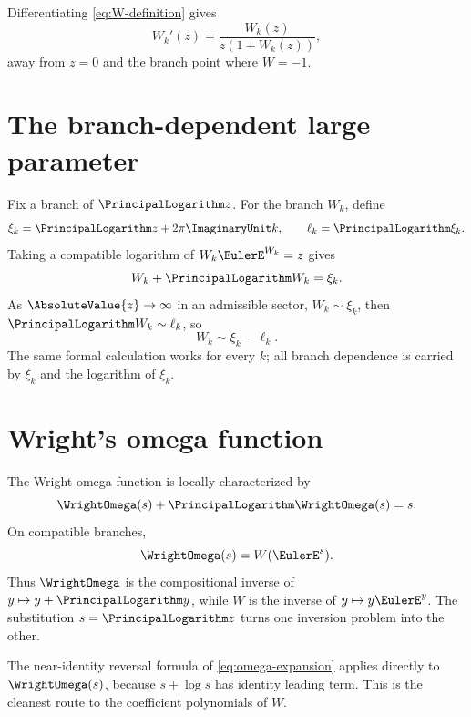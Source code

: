 \documentclass[11pt,openany]{book}
\theoremstyle{definition}
\theoremstyle{plain}
\theoremstyle{remark}
\begin{document}
Differentiating \cref{eq:W-definition} gives
\begin{equation}\label{eq:W-derivative-exact}
 W_k'(z)=\frac{W_k(z)}{z(1+W_k(z))},
\end{equation}
away from \(z=0\) and the branch point where \(W=-1\).

\section{The branch-dependent large parameter}
Fix a branch of \(\PrincipalLogarithm z\). For the branch \(W_k\), define
\begin{equation}\label{eq:xi-k}
 \xi_k=\PrincipalLogarithm z+2\pi\ImaginaryUnit k,
 \qquad
 \ell_k=\PrincipalLogarithm\xi_k.
\end{equation}
Taking a compatible logarithm of \(W_k\EulerE^{W_k}=z\) gives
\begin{equation}\label{eq:W-log-branch}
 W_k+\PrincipalLogarithm W_k=\xi_k.
\end{equation}
As \(\AbsoluteValue{z}\to\infty\) in an admissible sector, \(W_k\sim\xi_k\), then \(\PrincipalLogarithm W_k\sim\ell_k\), so
\begin{equation}\label{eq:W-leading-two}
 W_k\sim\xi_k-\ell_k.
\end{equation}
The same formal calculation works for every \(k\); all branch dependence is carried by \(\xi_k\) and the logarithm of \(\xi_k\).

\section{Wright's omega function}
The Wright omega function is locally characterized by
\begin{equation}\label{eq:omega-def}
 \WrightOmega(s)+\PrincipalLogarithm\WrightOmega(s)=s.
\end{equation}
On compatible branches,
\begin{equation}\label{eq:omega-W}
 \WrightOmega(s)=W(\EulerE^s).
\end{equation}
Thus \(\WrightOmega\) is the compositional inverse of \(y\mapsto y+\PrincipalLogarithm y\), while \(W\) is the inverse of \(y\mapsto y\EulerE^y\). The substitution \(s=\PrincipalLogarithm z\) turns one inversion problem into the other.

The near-identity reversal formula of \cref{eq:omega-expansion} applies directly to \(\WrightOmega(s)\), because \(s+\log s\) has identity leading term. This is the cleanest route to the coefficient polynomials of \(W\).
\end{document}
